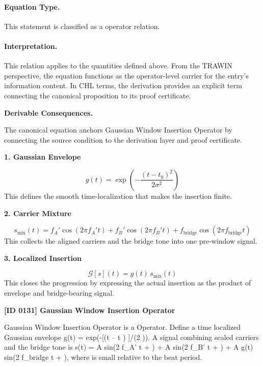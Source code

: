 \paragraph{Equation Type.}
This statement is classified as a operator relation.

\paragraph{Interpretation.}
This relation applies to the quantities defined above. From the TRAWIN perspective, the equation functions as the operator-level carrier for the entry’s information content. In CHL terms, the derivation provides an explicit term connecting the canonical proposition to its proof certificate.

\par\vspace{0.35em}
\noindent\textbf{Derivable Consequences.}\quad
\begingroup
\footnotesize
\raggedright
The canonical equation anchors Gaussian Window Insertion Operator by connecting the source condition to the derivation layer and proof certificate.
\par\endgroup

\noindent\textbf{1. Gaussian Envelope}\par
\[
g(t)=\exp\!\left(-\frac{(t-t_0)^2}{2\sigma^2}\right)
\]
\noindent This defines the smooth time-localization that makes the insertion finite.\par
\noindent\textbf{2. Carrier Mixture}\par
\[
s_{\mathrm{mix}}(t)=f_A'\cos(2\pi f_A' t)+f_B'\cos(2\pi f_B' t)+f_{\mathrm{bridge}}\cos(2\pi f_{\mathrm{bridge}} t)
\]
\noindent This collects the aligned carriers and the bridge tone into one pre-window signal.\par
\noindent\textbf{3. Localized Insertion}\par
\[
\mathcal{G}[s](t)=g(t)\,s_{\mathrm{mix}}(t)
\]
\noindent This closes the progression by expressing the actual insertion as the product of envelope and bridge-bearing signal.\par

\clearpage
\noindent\textbf{[ID 0131] Gaussian Window Insertion Operator}\par
\vspace{0.35em}
\begingroup\small
{}
Gaussian Window Insertion Operator is a Operator. Define a time localized Gaussian envelope g(t) = exp(-[(t -- t ) ]/(2   )). A signal combining scaled carriers and the bridge tone is s(t) = A  sin(2  f\_A' t +   ) + A  sin(2  f\_B' t +   ) + A  g(t) sin(2  f\_bridge t +   ), where   is small relative to the beat period.

